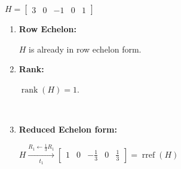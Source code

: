 $H=
\begin{bmatrix}
    3 & 0 & -1 & 0 & 1
\end{bmatrix}
$ \\[1.0em]

\begin{enumerate}
    \item
    \textbf{Row Echelon:}
    \begin{answer}
        $H$ is already in row echelon form.
    \end{answer}

    \item
    \textbf{Rank:}
    \begin{answer}
        $\operatorname{rank}(H)=1.$
    \end{answer} \\

    \item
    \textbf{Reduced Echelon form:} \\[1.0em]
    \begin{answer}
        $H \xrightarrow[t_1]{R_1 \leftarrow \frac{1}{3}R_1}
        \begin{bmatrix}
            1 & 0 & -\frac{1}{3} & 0 & \frac{1}{3}
        \end{bmatrix}
        = \operatorname{rref}(H)$
    \end{answer}
\end{enumerate}
